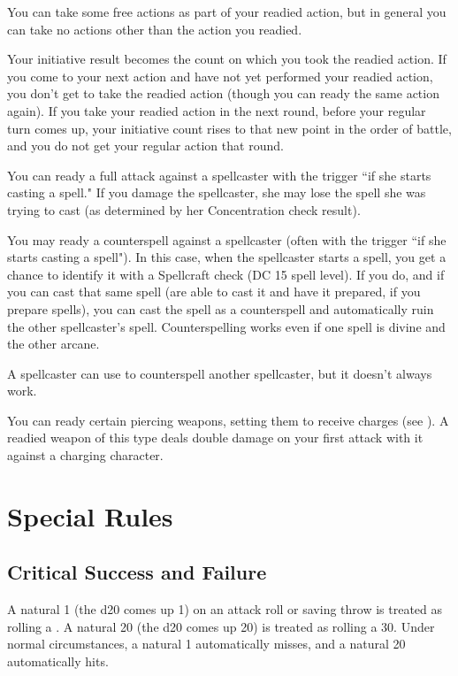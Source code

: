 You can take some free actions as part of your readied action, but in general you can take no actions other than the action you readied.

 Your initiative result becomes the count on which you took the readied action. If you come to your next action and have not yet performed your readied action, you don't get to take the readied action (though you can ready the same action again). If you take your readied action in the next round, before your regular turn comes up, your initiative count rises to that new point in the order of battle, and you do not get your regular action that round.

 You can ready a full attack against a spellcaster with the trigger ``if she starts casting a spell." If you damage
the spellcaster, she may lose the spell she was trying to cast (as determined by her Concentration check result).

 You may ready a counterspell against a spellcaster (often with the trigger ``if she starts casting a spell"). In this case, when the spellcaster starts a spell, you get a chance to identify it with a Spellcraft check (DC 15 \add spell level). If you do, and if you can cast that same spell (are able to cast it and have it prepared, if you prepare spells), you can cast the spell as a counterspell and automatically ruin the other spellcaster's spell. Counterspelling works even if one spell is divine and the other arcane.

A spellcaster can use  to counterspell another spellcaster, but it doesn't always work.

 You can ready certain piercing weapons, setting them to receive charges (see ). A readied weapon of this type deals double damage on your first attack with it against a charging character.

\section{Special Rules}

\subsection{Critical Success and Failure}
A natural 1 (the d20 comes up 1) on an attack roll or saving throw is treated as rolling a . A natural 20 (the d20 comes up 20) is treated as rolling a 30. Under normal circumstances, a natural 1 automatically misses, and a natural 20 automatically hits.


